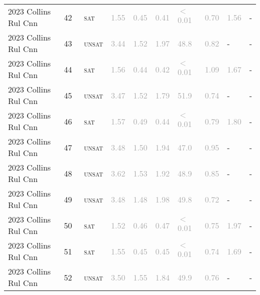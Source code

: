 \begin{center}
{\begin{longtable}{@{}llllllllll@{}}
2023 Collins Rul Cnn & 42 & ~\textsc{sat} & \textcolor{darkgray}{1.55} & \textcolor{darkgray}{0.45} & \textcolor{darkgray}{0.41} & \textcolor{darkgray}{$<$0.01} & \textcolor{darkgray}{0.70} & \textcolor{darkgray}{1.56} & - \\
2023 Collins Rul Cnn & 43 & ~\textsc{unsat} & \textcolor{darkgray}{3.44} & \textcolor{darkgray}{1.52} & \textcolor{darkgray}{1.97} & \textcolor{darkgray}{48.8} & \textcolor{darkgray}{0.82} & - & - \\
2023 Collins Rul Cnn & 44 & ~\textsc{sat} & \textcolor{darkgray}{1.56} & \textcolor{darkgray}{0.44} & \textcolor{darkgray}{0.42} & \textcolor{darkgray}{$<$0.01} & \textcolor{darkgray}{1.09} & \textcolor{darkgray}{1.67} & - \\
2023 Collins Rul Cnn & 45 & ~\textsc{unsat} & \textcolor{darkgray}{3.47} & \textcolor{darkgray}{1.52} & \textcolor{darkgray}{1.79} & \textcolor{darkgray}{51.9} & \textcolor{darkgray}{0.74} & - & - \\
2023 Collins Rul Cnn & 46 & ~\textsc{sat} & \textcolor{darkgray}{1.57} & \textcolor{darkgray}{0.49} & \textcolor{darkgray}{0.44} & \textcolor{darkgray}{$<$0.01} & \textcolor{darkgray}{0.79} & \textcolor{darkgray}{1.80} & - \\
2023 Collins Rul Cnn & 47 & ~\textsc{unsat} & \textcolor{darkgray}{3.48} & \textcolor{darkgray}{1.50} & \textcolor{darkgray}{1.94} & \textcolor{darkgray}{47.0} & \textcolor{darkgray}{0.95} & - & - \\
2023 Collins Rul Cnn & 48 & ~\textsc{unsat} & \textcolor{darkgray}{3.62} & \textcolor{darkgray}{1.53} & \textcolor{darkgray}{1.92} & \textcolor{darkgray}{48.9} & \textcolor{darkgray}{0.85} & - & - \\
2023 Collins Rul Cnn & 49 & ~\textsc{unsat} & \textcolor{darkgray}{3.48} & \textcolor{darkgray}{1.48} & \textcolor{darkgray}{1.98} & \textcolor{darkgray}{49.8} & \textcolor{darkgray}{0.72} & - & - \\
2023 Collins Rul Cnn & 50 & ~\textsc{sat} & \textcolor{darkgray}{1.52} & \textcolor{darkgray}{0.46} & \textcolor{darkgray}{0.47} & \textcolor{darkgray}{$<$0.01} & \textcolor{darkgray}{0.75} & \textcolor{darkgray}{1.97} & - \\
2023 Collins Rul Cnn & 51 & ~\textsc{sat} & \textcolor{darkgray}{1.55} & \textcolor{darkgray}{0.45} & \textcolor{darkgray}{0.45} & \textcolor{darkgray}{$<$0.01} & \textcolor{darkgray}{0.74} & \textcolor{darkgray}{1.69} & - \\
2023 Collins Rul Cnn & 52 & ~\textsc{unsat} & \textcolor{darkgray}{3.50} & \textcolor{darkgray}{1.55} & \textcolor{darkgray}{1.84} & \textcolor{darkgray}{49.9} & \textcolor{darkgray}{0.76} & - & - \\

\end{longtable}}
\end{center}
